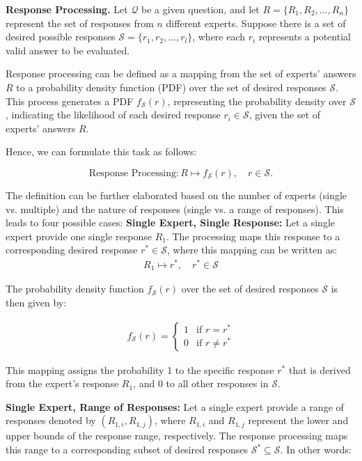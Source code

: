 \begin{definition}
    \textbf{Response Processing. }Let $\mathcal{Q}$ be a given question, and let $R = \{R_1, R_2, \ldots, R_n\}$ represent the set of responses from $n$ different experts. Suppose there is a set of desired possible responses $\mathcal{S} = \{r_1, r_2, \ldots, r_l\}$, where each $r_i$ represents a potential valid answer to be evaluated.
   \end{definition}

Response processing can be defined as a mapping from the set of experts' answers $R$ to a probability density function (PDF) over the set of desired responses $\mathcal{S}$. This process generates a PDF $f_{\mathcal{S}}(r)$, representing the probability density over $\mathcal{S}$, indicating the likelihood of each desired response $r_i \in \mathcal{S}$, given the set of experts' answers $R$. 

Hence, we can formulate this task as follows:

\[
\text{Response Processing}: R \mapsto f_{\mathcal{S}}(r), \quad r \in \mathcal{S}.
\]

The definition can be further elaborated based on the number of experts (single vs. multiple) and the nature of responses (single  vs. a range of responses). This leads to four possible cases:
\textbf{Single Expert, Single Response:} Let a single expert provide one single response $R_1$. The  processing maps this response to a corresponding desired response $r^* \in \mathcal{S}$, where this mapping can be written as:
\begin{align*}
    R_1 \mapsto r^*, \quad r^* \in \mathcal{S}
\end{align*}


The probability density function $f_{\mathcal{S}}(r)$ over the set of desired responses $\mathcal{S}$ is then given by:

\begin{align*}
f_{\mathcal{S}}(r) =
\begin{cases}
1 & \text{if } r = r^* \\
0 & \text{if } r \neq r^*
\end{cases}
\end{align*}


This mapping assigns the probability 1 to the specific response $r^*$ that is derived from the expert's response $R_1$, and 0 to all other responses in $\mathcal{S}$.

\textbf{Single Expert, Range of Responses:} Let a single expert provide a range of responses denoted by $(R_{1,i}, R_{1,j})$, where $R_{1,i}$ and $R_{1,j}$ represent the lower and upper bounds of the response range, respectively. The response processing maps this range to a corresponding subset of desired responses $\mathcal{S}^* \subseteq \mathcal{S}$. In other words:

